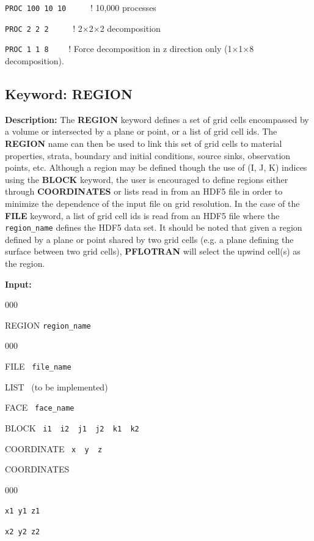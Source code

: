 \begin{mdframed}

\footnotesize

{\tt PROC 100 10 10} \ \ \ \ \ ! 10,000 processes

{\tt PROC 2 2 2} \ \ \ \ \ ! 2$\times$2$\times$2 decomposition

{\tt PROC 1 1 8} \ \ \ \ ! Force decomposition in z direction only (1$\times$1$\times$8 decomposition).
\normalsize
\end{mdframed}

\hyperlink{target_key}{\return}


\newpage
\protect\hypertarget{target_region}{}


\subsection{Keyword: REGION}

\hfill\hyperlink{target_key}{\return}

{\noindent\bf Description:}
The {\bf REGION} keyword defines a set of grid cells encompassed by a volume or intersected by a plane or point, or a list of grid cell ids.  The {\bf REGION} name can then be used to link this set of grid cells to material properties, strata, boundary and initial conditions, source sinks, observation points, etc.  Although a region may be defined though the use of (I, J, K) indices using the {\bf BLOCK} keyword, the user is encouraged to define regions either through {\bf COORDINATES} or lists read in from an HDF5 file in order to minimize the dependence of the input file on grid resolution.  In the case of the {\bf FILE} keyword, a list of grid cell ids is read from an HDF5 file where the {\tt region\_name} defines the HDF5 data set.  It should be noted that given a region defined by a plane or point shared by two grid cells (e.g. a plane defining the surface between two grid cells), {\bf PFLOTRAN} will select the upwind cell(s) as the region.

{\noindent\bf Input:}

\begin{deflist}{000}
\item[REGION] {\tt region\_name}
\begin{deflist}{000}
\item[FILE] \ {\tt file\_name}
\item[LIST] \ (to be implemented)
\item[FACE] \ {\tt face\_name}
\item[BLOCK] \ {\tt i1 \ i2 \ j1 \ j2 \ k1 \ k2}
\item[COORDINATE] \ {\tt x \ y \ z}
\item[COORDINATES] ~
\begin{deflist}{000}
\item[\tt x1 y1 z1]
\item[\tt x2 y2 z2]
\end{deflist}
\item[\keyend]
\end{deflist}
\item[\keyend]
\end{deflist}

